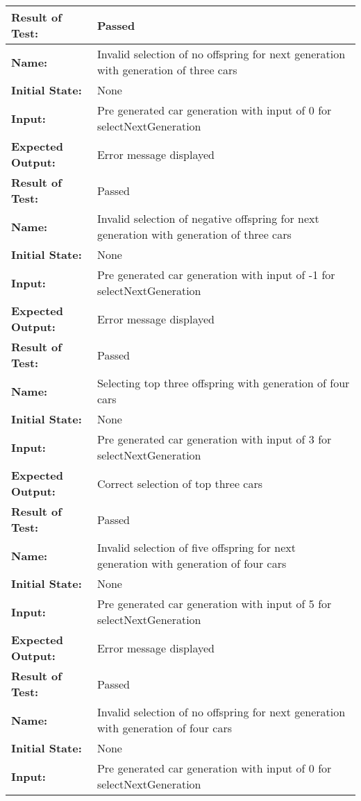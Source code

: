 \documentclass[12pt, titlepage]{article}
\begin{document}
\begin{center}
\begin{longtable}{ l | p{10cm} }
\textbf{Result of Test:} & Passed\\
\hline
\rule{0pt}{1.5em}\textbf{Name:} & Invalid selection of no offspring for next 
generation with generation of three cars\\
\textbf{Initial State:} & None\\
\textbf{Input:} & Pre generated car generation with input of 0 for 
selectNextGeneration\\
\textbf{Expected Output:} & Error message displayed\\[0.6em]
\textbf{Result of Test:} & Passed\\
\hline
\rule{0pt}{1.5em}\textbf{Name:} & Invalid selection of negative offspring for 
next generation with generation of three cars\\
\textbf{Initial State:} & None\\
\textbf{Input:} & Pre generated car generation with input of -1 for 
selectNextGeneration\\
\textbf{Expected Output:} & Error message displayed\\[0.6em]
\textbf{Result of Test:} & Passed\\
\hline
\rule{0pt}{1.5em}\textbf{Name:} & Selecting top three offspring with generation 
of four cars\\
\textbf{Initial State:} & None\\
\textbf{Input:} & Pre generated car generation with input of 3 for 
selectNextGeneration\\
\textbf{Expected Output:} & Correct selection of top three cars\\[0.6em]
\textbf{Result of Test:} & Passed\\
\hline
\rule{0pt}{1.5em}\textbf{Name:} & Invalid selection of five offspring for next 
generation with generation of four cars\\
\textbf{Initial State:} & None\\
\textbf{Input:} & Pre generated car generation with input of 5 for 
selectNextGeneration\\
\textbf{Expected Output:} & Error message displayed\\[0.6em]
\textbf{Result of Test:} & Passed\\
\hline
\rule{0pt}{1.5em}\textbf{Name:} & Invalid selection of no offspring for next 
generation with generation of four cars\\
\textbf{Initial State:} & None\\
\textbf{Input:} & Pre generated car generation with input of 0 for 
selectNextGeneration\\

\end{longtable}
\end{center}
\end{document}
